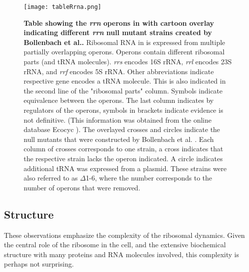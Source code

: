 \begin{figure}
    \centering
    \texttt{[image: tableRrna.png]}
    \caption{ 
        \textbf{Table showing the \textit{rrn} operons in \ecoli with cartoon overlay indicating different \textit{rrn} null mutant strains created by Bollenbach et al..}
        Ribosomal RNA in \ecoli is expressed from multiple partially overlapping operons. 
        Operons contain different ribosomal parts (and tRNA molecules). 
        \textit{rrs} encodes 16S rRNA, \textit{rrl} encodes 23S rRNA, and \textit{rrf} encodes 5S rRNA.
        Other abbreviations indicate respective gene encodes a tRNA molecule.
        This is also indicated in the second line of the "ribosomal parts" column. 
        Symbols indicate equivalence between the operons.
        The last column indicates by regulators of the operons, symbols in brackets indicate evidence is not definitive.
        (This information was obtained from the online database Ecocyc \cite{Keseler2017}).
        The overlayed crosses and circles indicate the null mutants that were constructed by Bollenbach et al. \cite{Bollenbach2009}.
        Each column of crosses corresponds to one strain, a cross indicates that the respective strain lacks the operon indicated. A circle indicates additional tRNA was expressed from a plasmid.
        These strains were also referred to as $\Delta$1-6, where the number corresponds to the number of operons that were removed.
    }
    \label{fig:ribo:tabledeltarrn}
\end{figure}



\subsection{Structure}
These observations emphasize the complexity of the ribosomal dynamics.
%
Given the central role of the ribosome in the cell, and the extensive biochemical structure with many proteins and RNA molecules involved, 
this complexity is perhaps not surprising.
%








